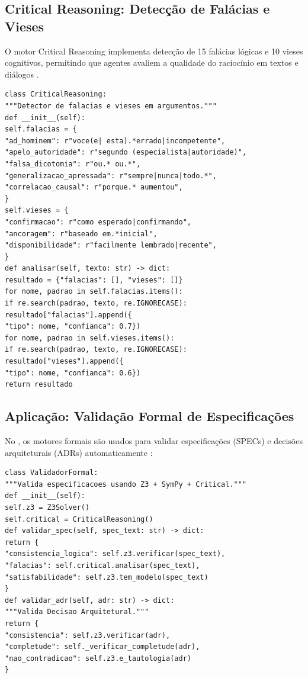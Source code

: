 \subsection{Critical Reasoning: Detecção de Falácias e Vieses}
O motor Critical Reasoning implementa detecção de 15 falácias lógicas e 10
vieses cognitivos, permitindo que agentes avaliem a qualidade do raciocínio
em textos e diálogos \cite{broniatowski2019critical}.
\begin{lstlisting}[style=pythonstyle]
class CriticalReasoning:
"""Detector de falacias e vieses em argumentos."""
def __init__(self):
self.falacias = {
"ad_hominem": r"voce(e| esta).*errado|incompetente",
"apelo_autoridade": r"segundo (especialista|autoridade)",
"falsa_dicotomia": r"ou.* ou.*",
"generalizacao_apressada": r"sempre|nunca|todo.*",
"correlacao_causal": r"porque.* aumentou",
}
self.vieses = {
"confirmacao": r"como esperado|confirmando",
"ancoragem": r"baseado em.*inicial",
"disponibilidade": r"facilmente lembrado|recente",
}
def analisar(self, texto: str) -> dict:
resultado = {"falacias": [], "vieses": []}
for nome, padrao in self.falacias.items():
if re.search(padrao, texto, re.IGNORECASE):
resultado["falacias"].append({
"tipo": nome, "confianca": 0.7})
for nome, padrao in self.vieses.items():
if re.search(padrao, texto, re.IGNORECASE):
resultado["vieses"].append({
"tipo": nome, "confianca": 0.6})
return resultado
\end{lstlisting}
\subsection{Aplicação: Validação Formal de Especificações}
No \opencodeeco{}, os motores formais são usados para validar
especificações (SPECs) e decisões arquiteturais (ADRs) automaticamente
\cite{opencode2026spec036, opencode2026spec037}:
\begin{lstlisting}[style=pythonstyle]
class ValidadorFormal:
"""Valida especificacoes usando Z3 + SymPy + Critical."""
def __init__(self):
self.z3 = Z3Solver()
self.critical = CriticalReasoning()
def validar_spec(self, spec_text: str) -> dict:
return {
"consistencia_logica": self.z3.verificar(spec_text),
"falacias": self.critical.analisar(spec_text),
"satisfabilidade": self.z3.tem_modelo(spec_text)
}
def validar_adr(self, adr: str) -> dict:
"""Valida Decisao Arquitetural."""
return {
"consistencia": self.z3.verificar(adr),
"completude": self._verificar_completude(adr),
"nao_contradicao": self.z3.e_tautologia(adr)
}
\end{lstlisting}

